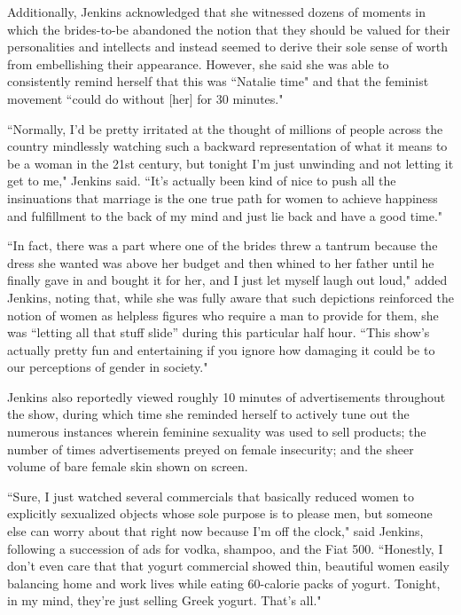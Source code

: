 \documentclass[12pt]{book}
\renewcommand{\indent}{\hspace{1cm}}
\begin{document}
\begin{linenumbers*}
\indent Additionally, Jenkins acknowledged that she witnessed dozens of moments in which the brides-to-be abandoned the notion that they should be valued for their personalities and intellects and instead seemed to derive their sole sense of worth from embellishing their appearance. However, she said she was able to consistently remind herself that this was ``Natalie time" and that the feminist movement ``could do without [her] for 30 minutes."

\indent ``Normally, I'd be pretty irritated at the thought of millions of people across the country mindlessly watching such a backward representation of what it means to be a woman in the 21st century, but tonight I'm just unwinding and not letting it get to me," Jenkins said. ``It's actually been kind of nice to push all the insinuations that marriage is the one true path for women to achieve happiness and fulfillment to the back of my mind and just lie back and have a good time." 

\indent ``In fact, there was a part where one of the brides threw a tantrum because the dress she wanted was above her budget and then whined to her father until he finally gave in and bought it for her, and I just let myself laugh out loud," added Jenkins, noting that, while she was fully aware that such depictions reinforced the notion of women as helpless figures who require a man to provide for them, she was “letting all that stuff slide” during this particular half hour. ``This show's actually pretty fun and entertaining if you ignore how damaging it could be to our perceptions of gender in society."

\indent Jenkins also reportedly viewed roughly 10 minutes of advertisements throughout the show, during which time she reminded herself to actively tune out the numerous instances wherein feminine sexuality was used to sell products; the number of times advertisements preyed on female insecurity; and the sheer volume of bare female skin shown on screen.

\indent ``Sure, I just watched several commercials that basically reduced women to explicitly sexualized objects whose sole purpose is to please men, but someone else can worry about that right now because I'm off the clock," said Jenkins, following a succession of ads for vodka, shampoo, and the Fiat 500. ``Honestly, I don't even care that that yogurt commercial showed thin, beautiful women easily balancing home and work lives while eating 60-calorie packs of yogurt. Tonight, in my mind, they're just selling Greek yogurt. That's all."


\end{linenumbers*}
\end{document}
